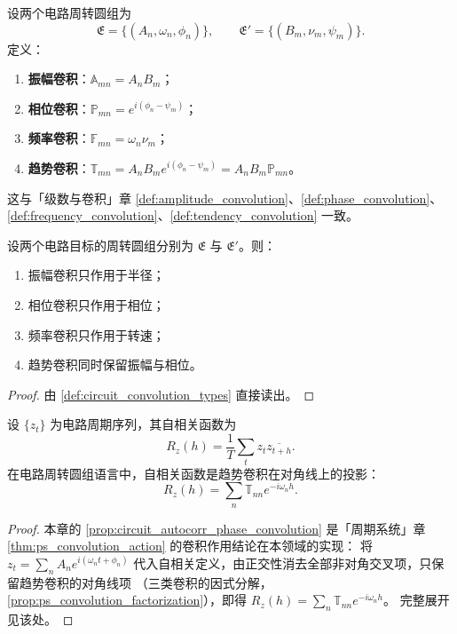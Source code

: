 \begin{definition}\label{def:circuit_convolution_types}
设两个电路周转圆组为
\[
\mathfrak E=\{(A_n,\omega_n,\phi_n)\},\qquad
\mathfrak E'=\{(B_m,\nu_m,\psi_m)\}.
\]
定义：
\begin{enumerate}[label=(\roman*)]
    \item \textbf{振幅卷积}：$\mathbb A_{mn}=A_nB_m$；
    \item \textbf{相位卷积}：$\mathbb P_{mn}=e^{i(\phi_n-\psi_m)}$；
    \item \textbf{频率卷积}：$\mathbb F_{mn}=\omega_n\nu_m$；
    \item \textbf{趋势卷积}：$\mathbb T_{mn}=A_nB_m e^{i(\phi_n-\psi_m)}=A_nB_m\mathbb P_{mn}$。
\end{enumerate}
这与「级数与卷积」章 \cref{def:amplitude_convolution}、\cref{def:phase_convolution}、\cref{def:frequency_convolution}、\cref{def:tendency_convolution} 一致。
\end{definition}

\begin{theorem}[三类卷积在电路周转圆组上的作用]\label{thm:circuit_convolution_action}
设两个电路目标的周转圆组分别为 $\mathfrak E$ 与 $\mathfrak E'$。则：
\begin{enumerate}[label=(\roman*)]
    \item 振幅卷积只作用于半径；
    \item 相位卷积只作用于相位；
    \item 频率卷积只作用于转速；
    \item 趋势卷积同时保留振幅与相位。
\end{enumerate}
\end{theorem}

\begin{proof}
由 \cref{def:circuit_convolution_types} 直接读出。
\end{proof}

\begin{proposition}[自相关与趋势卷积]\label{prop:circuit_autocorr_phase_convolution}
设 $\{z_t\}$ 为电路周期序列，其自相关函数为
\[
R_z(h)=\frac1T\sum_t z_t\overline{z_{t+h}}.
\]
在电路周转圆组语言中，自相关函数是趋势卷积在对角线上的投影：
\[
R_z(h)=\sum_n\mathbb T_{nn}e^{-i\omega_n h}.
\]
\end{proposition}

\begin{proof}
本章的 \cref{prop:circuit_autocorr_phase_convolution} 是「周期系统」章 \cref{thm:ps_convolution_action} 的卷积作用结论在本领域的实现：
将 $z_t=\sum_n A_n e^{i(\omega_n t+\phi_n)}$ 代入自相关定义，由正交性消去全部非对角交叉项，只保留趋势卷积的对角线项
（三类卷积的因式分解，\cref{prop:ps_convolution_factorization}），即得 $R_z(h)=\sum_n\mathbb T_{nn}e^{-i\omega_n h}$。
完整展开见该处。
\end{proof}

